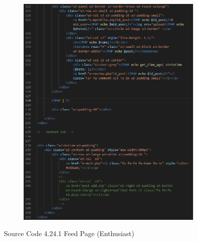 \begin{enumerate}[1.]
\begin{figure}[h]
        \begin{subfigure}[b]{0.6\textwidth}
            \centering
            \includegraphics[width=\textwidth]{mainmatter/images/frontend/code/efeed2.png}
            \label{fig:sub2}
        \end{subfigure}
        \caption*{Source Code 4.24.1 Feed Page (Enthusiast)}
        \label{fig:myfig63a}
    \end{figure}


\end{enumerate}

